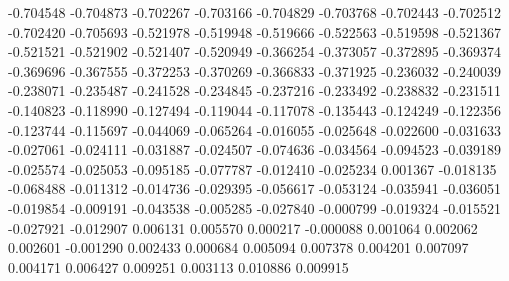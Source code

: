 -0.704548
-0.704873
-0.702267
-0.703166
-0.704829
-0.703768
-0.702443
-0.702512
-0.702420
-0.705693
-0.521978
-0.519948
-0.519666
-0.522563
-0.519598
-0.521367
-0.521521
-0.521902
-0.521407
-0.520949
-0.366254
-0.373057
-0.372895
-0.369374
-0.369696
-0.367555
-0.372253
-0.370269
-0.366833
-0.371925
-0.236032
-0.240039
-0.238071
-0.235487
-0.241528
-0.234845
-0.237216
-0.233492
-0.238832
-0.231511
-0.140823
-0.118990
-0.127494
-0.119044
-0.117078
-0.135443
-0.124249
-0.122356
-0.123744
-0.115697
-0.044069
-0.065264
-0.016055
-0.025648
-0.022600
-0.031633
-0.027061
-0.024111
-0.031887
-0.024507
-0.074636
-0.034564
-0.094523
-0.039189
-0.025574
-0.025053
-0.095185
-0.077787
-0.012410
-0.025234
0.001367
-0.018135
-0.068488
-0.011312
-0.014736
-0.029395
-0.056617
-0.053124
-0.035941
-0.036051
-0.019854
-0.009191
-0.043538
-0.005285
-0.027840
-0.000799
-0.019324
-0.015521
-0.027921
-0.012907
0.006131
0.005570
0.000217
-0.000088
0.001064
0.002062
0.002601
-0.001290
0.002433
0.000684
0.005094
0.007378
0.004201
0.007097
0.004171
0.006427
0.009251
0.003113
0.010886
0.009915
